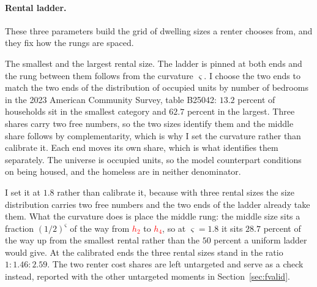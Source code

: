 \documentclass[10pt]{article}
\begin{document}
\paragraph{Rental ladder.} These three parameters build the grid of dwelling sizes a renter chooses from, and they fix how the rungs are spaced.
\begin{description}\setlength{\itemsep}{0.25em}\setlength{\parskip}{0em}
\item[\textcolor{red}{$h_2$} and \textcolor{red}{$h_4$}, the rental ladder.] The smallest and
the largest rental size. The ladder is pinned at both ends and the rung between
them follows from the curvature $\varsigma$.
I choose the two ends to match the two ends of the distribution of occupied units
by number of bedrooms in the 2023 American Community Survey, table B25042: $13.2$
percent of households sit in the smallest category and $62.7$ percent in the
largest. Three shares carry two free numbers, so the two sizes identify them and the
middle share follows by complementarity, which is why I set the curvature rather
than calibrate it. Each end moves its own share, which is what identifies them
separately. The universe is occupied units, so the
model counterpart conditions on being housed, and the homeless are in neither
denominator.
\item[$\varsigma$, the curvature of the rental ladder.]
I set it at $1.8$ rather than calibrate it, because with three rental sizes the
size distribution carries two free numbers and the two ends of the ladder already
take them. What the curvature does is place the middle rung: the middle size sits a
fraction $(1/2)^{\varsigma}$ of the way from \textcolor{red}{$h_2$} to \textcolor{red}{$h_4$}, so at
$\varsigma=1.8$ it sits $28.7$ percent of the way up from the smallest rental
rather than the $50$ percent a uniform ladder would give. At the calibrated ends
the three rental sizes stand in the ratio $1 : 1.46 : 2.59$. The two renter cost
shares are left untargeted and serve as a check instead, reported with the other
untargeted moments in Section~\ref{sec:fvalid}.

\end{description}
\end{document}
